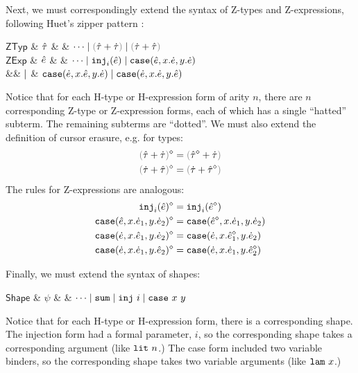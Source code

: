 Next, we must correspondingly extend the syntax of Z-types and
Z-expressions, following Huet's zipper pattern \cite{JFP::Huet1997}:\vspace{-11px}
\begin{grammar}
$\mathsf{ZTyp}$ & $\hat{\tau}$ & \bnfas & $\cdots \bnfalt \tsum{\ztau}{\htau} \bnfalt \tsum{\htau}{\ztau}$
\\
$\mathsf{ZExp}$ & $\hat{e}$ & \bnfas & $\cdots
\mathrel{\mid} \mathtt{inj}_{i}({\hat{e}})
\mathrel{\mid} \mathtt{case}({\hat{e}},{x}.{\dot{e}},{y}.{\dot{e}})$
\\
&& $\mathrel{\mid}$ & $\mathtt{case}({\dot{e}},{x}.{\hat{e}},{y}.{\dot{e}})
\mathrel{\mid}\mathtt{case}({\dot{e}},{x}.{\dot{e}},{y}.{\hat{e}})$
\end{grammar}
Notice that for each H-type or H-expression form of arity $n$, there are
$n$ corresponding Z-type or Z-expression forms, each of which has a single
``hatted'' subterm. The remaining subterms are ``dotted''. We must also
extend the definition of cursor erasure, e.g. for types:
\begin{align*}
\removeSel{\tsum{\ztau}{\htau}} & = \tsum{\removeSel{\ztau}}{\htau}\\
\removeSel{\tsum{\htau}{\ztau}} & = \tsum{\htau}{\removeSel{\ztau}}
\end{align*}
The rules for Z-expressions are analogous:
\begin{align*}
\mathtt{inj}_{i}({\hat{e}})^{\diamond} & = \mathtt{inj}_{i}({\hat{e}^{\diamond}})\\
\mathtt{case}({\hat{e}},{x}.{\dot{e}_1},{y}.{\dot{e}_2})^{\diamond} & = \mathtt{case}({\hat{e}^{\diamond}},{x}.{\dot{e}_1},{y}.{\dot{e}_2})\\
\mathtt{case}({\dot{e}},{x}.{\hat{e}_1},{y}.{\dot{e}_2})^{\diamond} & = \mathtt{case}({\dot{e}},{x}.{\hat{e}_1^{\diamond}},{y}.{\dot{e}_2})\\
\mathtt{case}({\dot{e}},{x}.{\dot{e}_1},{y}.{\hat{e}_2})^{\diamond} & = \mathtt{case}({\dot{e}},{x}.{\dot{e}_1},{y}.{\hat{e}_2^{\diamond}})
\end{align*}

Finally, we must extend the syntax of shapes:
\begin{grammar}
$\mathsf{Shape}$ & $\psi$ & \bnfas & $\cdots \mathrel{\mid} \mathtt{sum} \mathrel{\mid} \mathtt{inj}~i \mathrel{\mid} \mathtt{case}~x~y$
\end{grammar}
Notice that for each H-type or H-expression form, there is a corresponding
shape. The injection form had a formal parameter, $i$, so the corresponding
shape takes a corresponding argument (like $\mathtt{lit}~n$.) The case form
included two variable binders, so the corresponding shape takes two
variable arguments (like $\mathtt{lam}~x$.)



